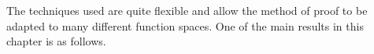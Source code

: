 The techniques used are quite flexible and allow the method of proof to be adapted to many different function spaces. One of the main results in this chapter is as follows.

%

